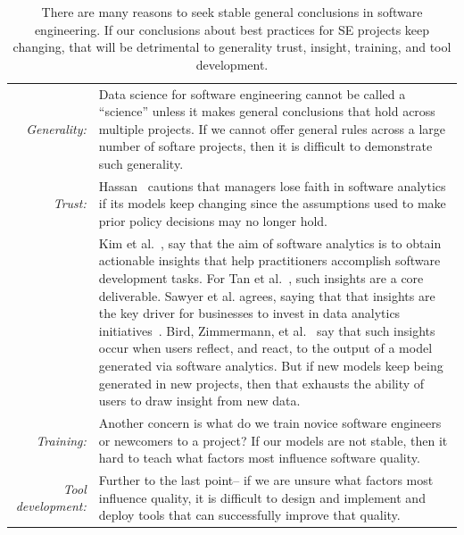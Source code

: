 \begin{table}[!b]
  \caption{There are many reasons to seek stable general conclusions in software
          engineering. If our conclusions about best practices for SE projects keep
          changing, that will be detrimental to generality trust, insight, training, and tool
          development.}\label{tbl:why}
 {  \begin{tabular}{|rp{.8\linewidth}|}\hline
 \rowcolor{blue!10}
  {\em Generality:}& Data science for software engineering cannot be called a ``science'' unless it makes general conclusions that hold across  multiple  projects. If we cannot offer general rules across a large number of softare projects, then it is   difficult to demonstrate such generality.
\\
{\em Trust:}&
 Hassan~\cite{Hassan17} cautions that 
managers lose faith
 in software analytics if its models keep changing
 since  the assumptions used to 
make prior policy decisions may no longer hold.
\\
 \rowcolor{blue!10}{\em Insight:}&
Kim et al.~\cite{Kim2016},
 say  that the aim of software analytics is to
        obtain actionable   insights
       that
        help practitioners accomplish   software development tasks.
 For Tan et al.~\cite{tan2016defining}, 
        such   insights  are a core deliverable. 
        Sawyer et al. agrees, saying that  that  insights are the key driver for businesses 
        to invest in data analytics initiatives~\cite{sawyer2013bi}.  
           Bird, Zimmermann, et al.~\cite{Bird:2015} say that such  insights occur when
        users reflect, and react, to the output of a model generated
        via software analytics. But if  new models keep being generated in new projects,  then that
          exhausts the ability of  users to draw insight from  new data.\\
       {\em Training:} &Another concern is what do we train novice software engineers
          or newcomers to a project?  
          If our models are not stable, then it hard to teach
          what factors  most influence software quality.\\
   \rowcolor{blue!10}        {\em Tool development:}&Further to the last point-- if we are unsure what 
          factors most influence quality, it is difficult to design and implement and deploy tools
          that can successfully improve that quality.\\\hline
          \end{tabular}}
          \end{table}    
          
